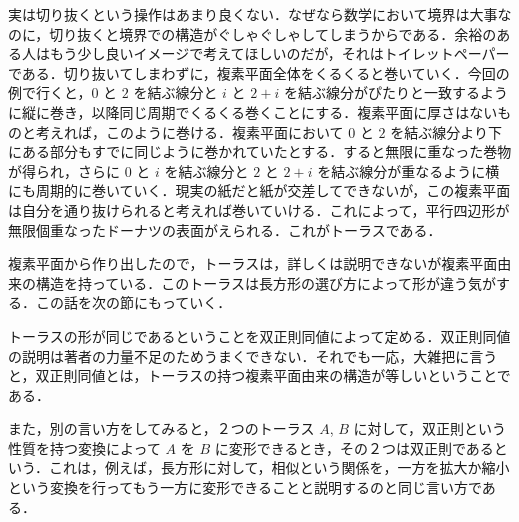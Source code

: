 実は切り抜くという操作はあまり良くない．なぜなら数学において境界は大事なのに，切り抜くと境界での構造がぐしゃぐしゃしてしまうからである．余裕のある人はもう少し良いイメージで考えてほしいのだが，それはトイレットペーパーである．切り抜いてしまわずに，複素平面全体をくるくると巻いていく．今回の例で行くと，$0$ と $2$ を結ぶ線分と $i$ と $2+i$ を結ぶ線分がぴたりと一致するように縦に巻き，以降同じ周期でくるくる巻くことにする．複素平面に厚さはないものと考えれば，このように巻ける．複素平面において $0$ と $2$ を結ぶ線分より下にある部分もすでに同じように巻かれていたとする．すると無限に重なった巻物が得られ，さらに $0$ と $i$ を結ぶ線分と $2$ と $2+i$ を結ぶ線分が重なるように横にも周期的に巻いていく．現実の紙だと紙が交差してできないが，この複素平面は自分を通り抜けられると考えれば巻いていける．これによって，平行四辺形が無限個重なったドーナツの表面がえられる．これがトーラスである．

複素平面から作り出したので，トーラスは，詳しくは説明できないが複素平面由来の構造を持っている．このトーラスは長方形の選び方によって形が違う気がする．この話を次の節にもっていく．

トーラスの形が同じであるということを双正則同値によって定める．双正則同値の説明は著者の力量不足のためうまくできない．それでも一応，大雑把に言うと，双正則同値とは，トーラスの持つ複素平面由来の構造が等しいということである．

また，別の言い方をしてみると，２つのトーラス $A$, $B$ に対して，双正則という性質を持つ変換によって $A$ を $B$ に変形できるとき，その２つは双正則であるという．これは，例えば，長方形に対して，相似という関係を，一方を拡大か縮小という変換を行ってもう一方に変形できることと説明するのと同じ言い方である．

